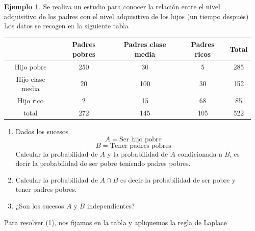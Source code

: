 \documentclass[]{book}
\theoremstyle{plain}
\theoremstyle{definition}
\newtheorem{example}[theorem]{Ejemplo}
\theoremstyle{definition} %
\begin{document}
\begin{example}
  Se realiza un estudio para conocer la relación entre el nivel adquisitivo de los padres con el nivel adquisitivo de los hijos (un tiempo después)
  Los datos se recogen en la siguiente tabla

  \begin{center}
    \begin{tabular}{c|ccc|c}
                         &Padres pobres&Padres clase media&Padres ricos & Total \\
       \hline
       Hijo pobre        &250          &30                &5            &285     \\
       Hijo clase media  &20           &100               &30           &152     \\
       Hijo rico         &2            &15                &68           &85      \\
       \hline         
       total             &272          &145               &105          &522     \\
      \end{tabular}
  \end{center}

  \begin{enumerate}
    \item Dados los sucesos
    \[A=\text{Ser hijo pobre}\]
    \[B=\text{Tener padres pobres}\] 
    Calcular la probabilidad de $A$ y la probabilidad de $A$ condicionada a $B$, es decir la
     probabilidad de ser pobre teniendo padres pobres.
    \item Calcular la probabilidad de $A\cap B$ es decir la probabilidad de ser pobre y tener padres pobres.
    \item  ¿Son los sucesos $A$ y $B$ independientes?
  \end{enumerate}

  Para resolver (1), nos fijamos en la tabla y apliquemos la regla de Laplace 


\end{example}
\end{document}
